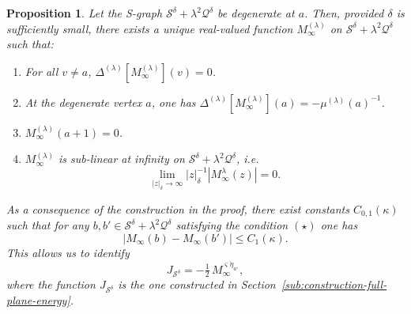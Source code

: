 \documentclass[reqno]{amsart}
\numberwithin{equation}{section}
\newtheorem{prop}[theo]{Proposition}
\theoremstyle{definition}
\theoremstyle{remark}
\newcommand\cQ{\mathcal{Q}}
\newcommand\cS{\mathcal{S}}
\begin{document}
\begin{prop}\label{prop:existence-uniqueness-full-plane-green}
Let the S-graph $\cS^\delta + \lambda^2\cQ^\delta$ be degenerate at $a$. Then, provided $\delta$ is sufficiently small, there exists a unique real-valued function $M^{(\lambda)}_{\infty}$ on $\cS^\delta + \lambda^2\cQ^\delta$ such that:
\begin{enumerate}
	\item For all $v \neq a$, $\Delta^{(\lambda)}[M^{(\lambda)}_{\infty}](v) = 0$.
	\item At the degenerate vertex $a$, one has $\Delta^{(\lambda)}[M^{(\lambda)}_{\infty}](a) = -\mu^{(\lambda)}(a)^{-1}$.
	\item $M^{(\lambda)}_{\infty}(a+1) = 0$.
	\item $M^{(\lambda)}_{\infty}$ is sub-linear at infinity on $\cS^\delta + \lambda^2\cQ^\delta$, i.e.
	\[
	\lim\limits_{|z|_\delta \to \infty} |z|_{\delta}^{-1} |M^{\lambda}_{\infty}(z)| = 0.
	\]
\end{enumerate}
As a consequence of the construction in the proof, there exist constants $C_{0,1}(\kappa)$ such that for any $b,b' \in \cS^\delta + \lambda^2\cQ^\delta$ satisfying the condition $(\star)$ one has
\begin{equation}
	|M_{\infty}(b) - M_{\infty}(b')| \leq C_1(\kappa).
\end{equation}
This allows us to identify
\[
J_{\cS^\delta} = -\tfrac{1}{2}\,M_\infty^{\overline{\varsigma \eta_{a^\circ}}},
\]
where the function $J_{\cS^\delta}$ is the one constructed in Section~\ref{sub:construction-full-plane-energy}.
\end{prop}
\end{document}
